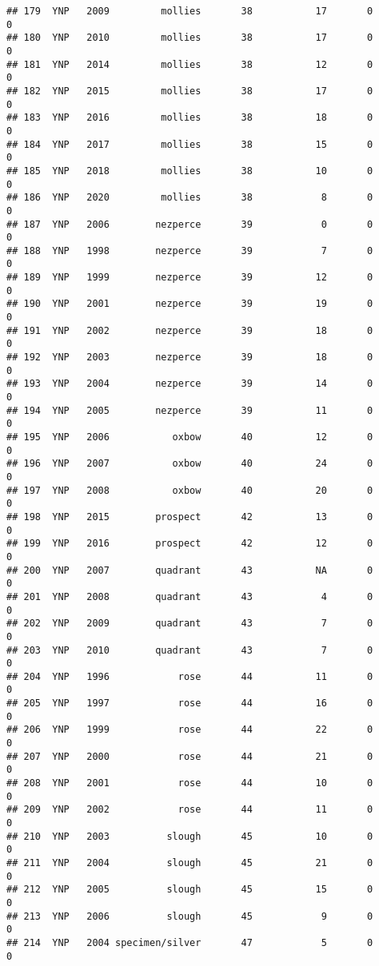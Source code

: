 \documentclass[
]{article}
\begin{document}
\begin{verbatim}
## 179  YNP   2009         mollies       38           17       0        0
## 180  YNP   2010         mollies       38           17       0        0
## 181  YNP   2014         mollies       38           12       0        0
## 182  YNP   2015         mollies       38           17       0        0
## 183  YNP   2016         mollies       38           18       0        0
## 184  YNP   2017         mollies       38           15       0        0
## 185  YNP   2018         mollies       38           10       0        0
## 186  YNP   2020         mollies       38            8       0        0
## 187  YNP   2006        nezperce       39            0       0        0
## 188  YNP   1998        nezperce       39            7       0        0
## 189  YNP   1999        nezperce       39           12       0        0
## 190  YNP   2001        nezperce       39           19       0        0
## 191  YNP   2002        nezperce       39           18       0        0
## 192  YNP   2003        nezperce       39           18       0        0
## 193  YNP   2004        nezperce       39           14       0        0
## 194  YNP   2005        nezperce       39           11       0        0
## 195  YNP   2006           oxbow       40           12       0        0
## 196  YNP   2007           oxbow       40           24       0        0
## 197  YNP   2008           oxbow       40           20       0        0
## 198  YNP   2015        prospect       42           13       0        0
## 199  YNP   2016        prospect       42           12       0        0
## 200  YNP   2007        quadrant       43           NA       0        0
## 201  YNP   2008        quadrant       43            4       0        0
## 202  YNP   2009        quadrant       43            7       0        0
## 203  YNP   2010        quadrant       43            7       0        0
## 204  YNP   1996            rose       44           11       0        0
## 205  YNP   1997            rose       44           16       0        0
## 206  YNP   1999            rose       44           22       0        0
## 207  YNP   2000            rose       44           21       0        0
## 208  YNP   2001            rose       44           10       0        0
## 209  YNP   2002            rose       44           11       0        0
## 210  YNP   2003          slough       45           10       0        0
## 211  YNP   2004          slough       45           21       0        0
## 212  YNP   2005          slough       45           15       0        0
## 213  YNP   2006          slough       45            9       0        0
## 214  YNP   2004 specimen/silver       47            5       0        0

\end{verbatim}
\end{document}
